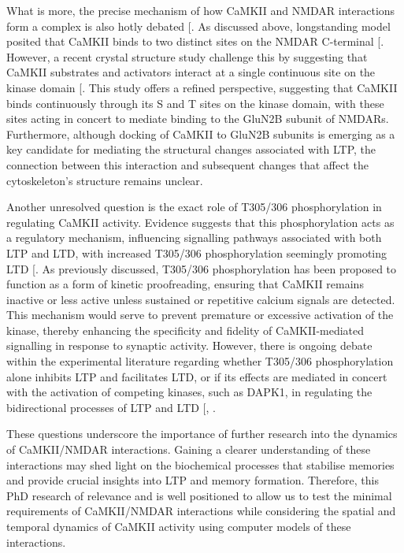 \documentclass[
  11pt,
  letterpaper,
]{scrreprt}
\begin{document}
What is more, the precise mechanism of how CaMKII and NMDAR interactions
form a complex is also hotly debated
{[}\citeproc{ref-ozden2022CaMKII}{169}{]}. As discussed above,
longstanding model posited that CaMKII binds to two distinct sites on
the NMDAR C-terminal {[}\citeproc{ref-bayer2001Interaction}{168}{]}.
However, a recent crystal structure study challenge this by suggesting
that CaMKII substrates and activators interact at a single continuous
site on the kinase domain {[}\citeproc{ref-ozden2022CaMKII}{169}{]}.
This study offers a refined perspective, suggesting that CaMKII binds
continuously through its S and T sites on the kinase domain, with these
sites acting in concert to mediate binding to the GluN2B subunit of
NMDARs. Furthermore, although docking of CaMKII to GluN2B subunits is
emerging as a key candidate for mediating the structural changes
associated with LTP, the connection between this interaction and
subsequent changes that affect the cytoskeleton's structure remains
unclear.

Another unresolved question is the exact role of T305/306
phosphorylation in regulating CaMKII activity. Evidence suggests that
this phosphorylation acts as a regulatory mechanism, influencing
signalling pathways associated with both LTP and LTD, with increased
T305/306 phosphorylation seemingly promoting LTD
{[}\citeproc{ref-cook2021CaMKIIb}{198}{]}. As previously discussed,
T305/306 phosphorylation has been proposed to function as a form of
kinetic proofreading, ensuring that CaMKII remains inactive or less
active unless sustained or repetitive calcium signals are detected. This
mechanism would serve to prevent premature or excessive activation of
the kinase, thereby enhancing the specificity and fidelity of
CaMKII-mediated signalling in response to synaptic activity. However,
there is ongoing debate within the experimental literature regarding
whether T305/306 phosphorylation alone inhibits LTP and facilitates LTD,
or if its effects are mediated in concert with the activation of
competing kinases, such as DAPK1, in regulating the bidirectional
processes of LTP and LTD {[},
\citeproc{ref-goodell2017DAPK1}{222}{]}.

These questions underscore the importance of further research into the
dynamics of CaMKII/NMDAR interactions. Gaining a clearer understanding
of these interactions may shed light on the biochemical processes that
stabilise memories and provide crucial insights into LTP and memory
formation. Therefore, this PhD research of relevance and is well
positioned to allow us to test the minimal requirements of CaMKII/NMDAR
interactions while considering the spatial and temporal dynamics of
CaMKII activity using computer models of these interactions.
\end{document}
